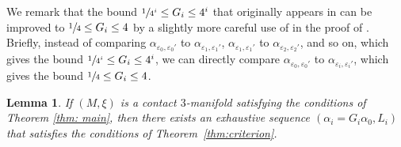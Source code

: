 \documentclass[10pt]{amsart}
\theoremstyle{plain}
\newtheorem{lemma}[thm]{Lemma}
\theoremstyle{definition}
\numberwithin{equation}{subsection}
\begin{document}
We remark that the bound $\sfrac{1}{4^i}\leq G_i\leq 4^i$ that originally appears in \cite[Prop.\,10.2]{CH2} can be improved to $\sfrac{1}{4} \leq G_i \leq 4$ by a slightly more careful use of \cite[Lem.\,10.4\,\&\,10.5]{CH2} in the proof of \cite[Prop.\,10.2]{CH2}. Briefly, instead of comparing $\alpha_{\varepsilon_0,\varepsilon_0'}$ to $\alpha_{\varepsilon_1,\varepsilon_1'}$, $\alpha_{\varepsilon_1,\varepsilon_1'}$ to $\alpha_{\varepsilon_2,\varepsilon_2'}$, and so on, which gives the bound $\sfrac{1}{4^i}\leq G_i\leq 4^i$, we can directly compare $\alpha_{\varepsilon_0,\varepsilon_0'}$ to $\alpha_{\varepsilon_i,\varepsilon_i'}$, which gives the bound $\sfrac{1}{4}\leq G_i\leq 4$.

\begin{lemma}\label{lemma: criterion satisfied}
If $(M,\xi)$ is a contact $3$-manifold satisfying the conditions of Theorem \ref{thm: main}, then there exists an exhaustive sequence $(\alpha_i=G_i\alpha_0,L_i)$ that satisfies the conditions of Theorem~\ref{thm:criterion}.
\end{lemma}
\end{document}
